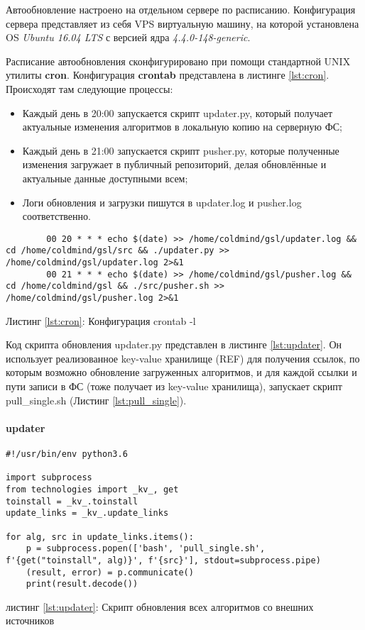 Автообновление настроено на отдельном сервере по расписанию. Конфигурация
сервера представляет из себя VPS виртуальную машину, на которой установлена OS
\emph{Ubuntu 16.04 LTS} с версией ядра \emph{4.4.0-148-generic}.

Расписание автообновления сконфигурировано при помощи стандартной UNIX утилиты
\textbf{cron}.  Конфигурация \textbf{crontab} представлена в листинге
\ref{lst:cron}. Происходят там следующие процессы:

\begin{itemize}
    \item Каждый день в 20:00 запускается скрипт {\small updater.py}, который получает актуальные изменения алгоритмов в локальную копию на серверную ФС;
    \item Каждый день в 21:00 запускается скрипт {\small pusher.py}, которые полученные изменения загружает в публичный репозиторий, делая обновлённые и актуальные данные доступными всем;
    \item Логи обновления и загрузки пишутся в {\small updater.log} и {\small pusher.log} соответственно.
\end{itemize}

\begin{center}
\begin{lstlisting}
        00 20 * * * echo $(date) >> /home/coldmind/gsl/updater.log && cd /home/coldmind/gsl/src && ./updater.py >> /home/coldmind/gsl/updater.log 2>&1
        00 21 * * * echo $(date) >> /home/coldmind/gsl/pusher.log && cd /home/coldmind/gsl && ./src/pusher.sh >> /home/coldmind/gsl/pusher.log 2>&1
\end{lstlisting}\label{lst:cron}
    Листинг \ref{lst:cron}: Конфигурация {\small crontab -l}
\end{center}

Код скрипта обновления {\small updater.py} представлен в листинге
\ref{lst:updater}. Он использует реализованное key-value хранилище (REF) для
получения ссылок, по которым возможно обновление загруженных алгоритмов, и для
каждой ссылки и пути записи в ФС (тоже получает из key-value хранилища),
запускает скрипт {\small pull\_single.sh} (Листинг \ref{lst:pull_single}).

\paragraph{updater}

\begin{center}
\begin{lstlisting}
#!/usr/bin/env python3.6

import subprocess
from technologies import _kv_, get
toinstall = _kv_.toinstall
update_links = _kv_.update_links

for alg, src in update_links.items():
    p = subprocess.popen(['bash', 'pull_single.sh', f'{get("toinstall", alg)}', f'{src}'], stdout=subprocess.pipe)
    (result, error) = p.communicate()
    print(result.decode())
\end{lstlisting}\label{lst:updater}
    листинг \ref{lst:updater}: Скрипт обновления всех алгоритмов со внешних источников
\end{center}

